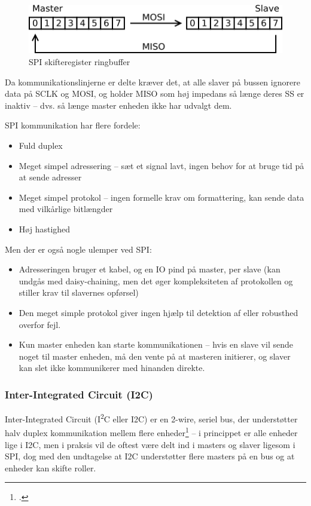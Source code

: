 \begin{figure}[H] \centering
    \includegraphics{0_Filer/Figuer/5_HW_Design/SPI_ringbuffer.png}
    \caption{SPI skifteregister ringbuffer}
    \label{fig:HWD_SPI_ring}
\end{figure}

Da kommunikationslinjerne er delte kræver det, at alle slaver på bussen ignorere data på SCLK og MOSI, og holder MISO som høj impedans så længe deres SS er inaktiv – dvs. så længe master enheden ikke har udvalgt dem.

SPI kommunikation har flere fordele:

\begin{itemize}
    \item Fuld duplex
    \item Meget simpel adressering – sæt et signal lavt, ingen behov for at bruge tid på at sende adresser
    \item Meget simpel protokol – ingen formelle krav om formattering, kan sende data med vilkårlige bitlængder
    \item Høj hastighed
\end{itemize}

Men der er også nogle ulemper ved SPI:

\begin{itemize}
    \item Adresseringen bruger et kabel, og en IO pind på master, per slave (kan undgås med daisy-chaining, men det øger kompleksiteten af protokollen og stiller krav til slavernes opførsel)
    \item Den meget simple protokol giver ingen hjælp til detektion af eller robusthed overfor fejl.
    \item Kun master enheden kan starte kommunikationen – hvis en slave vil sende noget til master enheden, må den vente på at masteren initierer, og slaver kan slet ikke kommunikerer med hinanden direkte.
\end{itemize}

\subsubsection{Inter-Integrated Circuit (I2C)}

Inter-Integrated Circuit (I\textsuperscript{2}C eller I2C) er en 2-wire, seriel bus, der understøtter halv duplex kommunikation mellem flere enheder\footcite{gfv} – i princippet er alle enheder lige i I2C, men i praksis vil de oftest være delt ind i masters og slaver ligesom i SPI, dog med den undtagelse at I2C understøtter flere masters på en bus og at enheder kan skifte roller.

